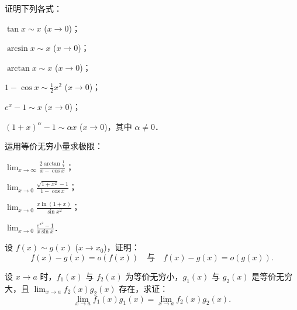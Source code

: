 \begin{xiti}
\item 证明下列各式：
\begin{ziti}
\item $\tan x \sim x$ ($x \to 0$)；
\item $\arcsin x \sim x$ ($x \to 0$)；
\item $\arctan x \sim x$ ($x \to 0$)；
\item $1 - \cos x \sim \frac{1}{2}x^2$ ($x \to 0$)；
\item $e^x - 1 \sim x$ ($x \to 0$)；
\item $(1 + x)^\alpha - 1 \sim \alpha x$ ($x \to 0$)，其中 $\alpha \neq 0$．
\end{ziti}

\item 运用等价无穷小量求极限：
\begin{ziti}
\item $\lim_{x \to \infty} \frac{2\arctan\frac{1}{x}}{x - \cos x}$；
\item $\lim_{x \to 0} \frac{\sqrt{1+x^2} - 1}{1 - \cos x}$；
\item $\lim_{x \to 0} \frac{x\ln(1+x)}{\sin x^2}$；
\item $\lim_{x \to 0} \frac{e^{x^2} - 1}{x\sin x}$．
\end{ziti}

\item 设 $f(x) \sim g(x)$ ($x \to x_0$)，证明：
\[
f(x) - g(x) = o(f(x)) \quad \text{与} \quad f(x) - g(x) = o(g(x)).
\]

\item 设 $x \to a$ 时，$f_1(x)$ 与 $f_2(x)$ 为等价无穷小，$g_1(x)$ 与 $g_2(x)$ 是等价无穷大，且 $\lim_{x \to a} f_2(x)g_2(x)$ 存在，求证：
\[
\lim_{x \to a} f_1(x)g_1(x) = \lim_{x \to a} f_2(x)g_2(x).
\]
\end{xiti}
